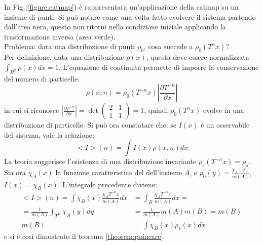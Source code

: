 \documentclass[12pt, a4paper]{book}
\theoremstyle{theorem}
\begin{document}
				In Fig.(\ref{figure:catmap}) è rappresentata un'applicazione della catmap su un insieme di punti.
				Si può notare come una volta fatto evolvere il sistema partendo dall'area nera, questo non ritorni nella condizione iniziale applicando la trasformazione inversa (area verde).
				\\
				Problema: data una distribuzione di punti $\rho_{0}$, cosa succede a $\rho_{0}(T^{n}x)$?
				\\
				Per definizione, data una distribuzione $\rho(x)$, questa deve essere normalizzata $\int_{\Pi^{2}}\rho(x)dx=1$.
				L'equazione di continuità permette di imporre la conservazione del numero di particelle:
				\begin{equation*}
					\rho(x,n)=\rho_{0}\left(T^{-n}x\right)\left\lvert\frac{\partial T^{-n}}{\partial x}\right\rvert 
				\end{equation*}
				in cui si riconosce $\left\lvert\frac{\partial T^{-n}}{\partial x}\right\rvert=
				\det
				\left(
					\begin{matrix}
						2 & 1\\
						1 & 1 
					\end{matrix}
				\right)=1$, quindi $\rho_{0}\left(T^{n}x\right)$ evolve in una distribuzione di particelle.
				Si può ora constatare che, se $I(x)$ è un osservabile del sistema, vale la relazione:
				\begin{equation*}
					<I>(n)=\int I(x)\rho(x,n)dx
				\end{equation*}
				La teoria suggerisce l'esistenza di una distribuzione invariante $\rho_{s}\left(T^{-n}x\right)=\rho_{s}$.
				Sia ora $\chi_{A}(x)$ la funzione caratteristica del dell'insieme $A$, e $\rho_{0}(y)=\frac{\chi_{A}(y)}{m(A)}$, $I(x)=\chi_{B}(x)$.
				L'integrale precedente diviene:
				\begin{equation}
					\begin{split}
						<I>(n)=\int\chi_{B}(x)\frac{\chi_{A}T^{-n}x}{m(A)}dx&=\int_{B}\frac{\chi_{A}T^{-n}x}{m(A)}dx=\\
						=\frac{1}{m(A)}\int_{T^{B}}\chi_{A}(y)dy&=\frac{1}{m(A)}m(A)m(B)=m(B)\\
						m(B)&=\int\chi_{B}(x)\rho_{s}(x)dx
					\end{split}
				\end{equation}
				e si è così dimostrato il teorema \ref{theorem:poincare}.
\end{document}
